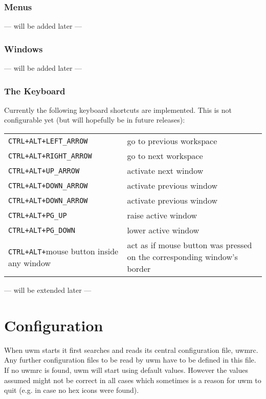 \documentclass[10pt,a4paper]{article}
\newcommand{\uwm}{{\sc uwm} }
\begin{document}
\section{Menus}
\begin{center} --- will be added later --- \end{center}
\section{Windows}
\begin{center} --- will be added later --- \end{center}
\section{The Keyboard}
Currently the following keyboard shortcuts are implemented. This is not configurable yet (but will hopefully be in future releases):

\begin{tabular}{p{4cm}p{8cm}}
\texttt{CTRL+ALT+LEFT\_ARROW} & go to previous workspace\\
\texttt{CTRL+ALT+RIGHT\_ARROW} & go to next workspace\\
\texttt{CTRL+ALT+UP\_ARROW} & activate next window\\
\texttt{CTRL+ALT+DOWN\_ARROW} & activate previous window\\
\texttt{CTRL+ALT+DOWN\_ARROW} & activate previous window\\
\texttt{CTRL+ALT+PG\_UP} & raise active window\\
\texttt{CTRL+ALT+PG\_DOWN} & lower active window\\
\texttt{CTRL+ALT+}mouse button inside any window & act as if mouse button was pressed on the corresponding window's border
\end{tabular}

\begin{center} --- will be extended later --- \end{center}

\part{Configuration}\label{Configuration}
When \uwm starts it first searches and reads its central configuration file, \textsf{uwmrc}. Any further configuration files to be read by \uwm have to be defined in this file. If no \textsf{uwmrc} is found, \uwm will start using default values. However the values assumed might not be correct in all cases which sometimes is a reason for uwm to quit (e.g. in case no hex icons were found).
\end{document}
